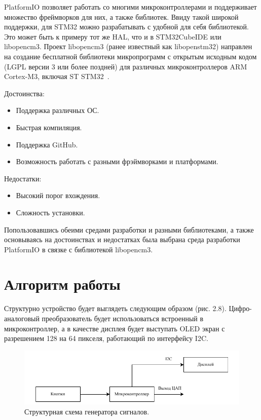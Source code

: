 	PlatformIO позволяет работать со многими микроконтроллерами и поддерживает множество фреймворков для них, а также библиотек. Ввиду такой широкой поддержки, для STM32 можно разрабатывать с удобной для себя библиотекой. Это может быть к примеру тот же HAL, что и в STM32CubeIDE или libopencm3. Проект libopencm3 (ранее известный как libopenstm32) направлен на создание бесплатной библиотеки микропрограмм с открытым исходным кодом (LGPL версии 3 или более поздней) для различных микроконтроллеров ARM Cortex-M3, включая ST STM32~\cite{lcm3}.


	Достоинства:
	\begin{itemize}
		\item Поддержка различных ОС.
		\item Быстрая компиляция.
		\item Поддержка GitHub.
		\item Возможность работать с разными фрэймворками и платформами.
	\end{itemize}
	
	Недостатки:
	\begin{itemize}
		\item Высокий порог вхождения.
		\item Сложность установки.
	\end{itemize}

	Попользовавшись обеими средами разработки и разными библиотеками, а также основываясь на достоинствах и недостатках была выбрана среда разработки PlatformIO в связке с библиотекой libopencm3.


\section{Алгоритм работы}

	Структурно устройство будет выглядеть следующим образом (рис. 2.8). Цифро-аналоговый преобразователь будет использоваться встроенный в микроконтроллер, а в качестве дисплея будет выступать OLED экран с разрешением 128 на 64 пикселя, работающий по интерфейсу I2C.
	
	\begin{figure}[H]
    \centering
    \includegraphics[width=1\textwidth]{../image/struct_gen.pdf}
    \caption{Структурная схема генератора сигналов.}
	\end{figure}


